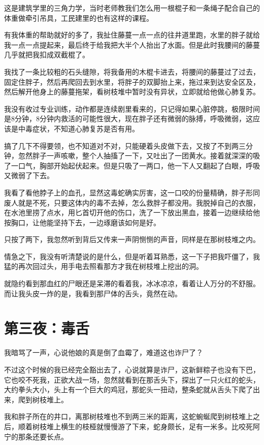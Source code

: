 这是建筑学里的三角力学，当时老师教我们怎么用一根棍子和一条绳子配合自己的体重做牵引吊具，工民建里的也有这样的课程。

有我体重的帮助就好的多了，我扯住藤蔓一点一点的往井道里跑，水里的胖子就给我一点一点提起来，最后终于给我把大半个人抬出了水面。但是此时我腰间的藤蔓几乎就把我扣成双截棍了。

我找了一条比较粗的石头缝隙，将我备用的木棍卡进去，将腰间的藤蔓过了过去，固定住胖子，然后再爬回去到水里，将胖子的双脚抬上来，拖过来到达安全区及，然后解开他身上的藤蔓拖架，看树枝堆中暂时没有异状，立即就给他做心肺复苏。

我没有收过专业训练，动作都是连续剧里看来的，只记得如果心脏停跳，极限时间是8分钟，8分钟内救活的可能性很大，现在胖子还有微弱的脉搏，呼吸微弱，这应该是中毒症状，不知道心肺复苏是否有用。

搞了几下不得要领，也不知道对不对，只能硬着头皮做下去，又按了不到两三分钟，忽然胖子一声咳嗽，整个人抽搐了一下，又吐出了一团黄水。接着就深深的吸了一口气，胸部开始起伏起来。但是只吸了一两口，他一下人又翻起了白眼，呼吸又微弱了下去。

我看了看他脖子上的血孔，显然这毒蛇确实厉害，这一口咬的份量精确，胖子形同废人就是不死，只要这体内的毒不去掉，怎么救胖子都没用。我脱掉自己的衣服，在水池里捞了点水，用匕首切开他的伤口，洗了一下放出黑血，接着一边继续给他按胸口，让他能坚持下去，一边琢磨该如何是好。

只按了两下，我忽然听到背后又传来一声阴恻恻的声音，同样是在那树枝堆之内。

情急之下，我没有听清楚说的是什么，但是听着耳熟悉，这一下子把我吓僵了，我猛的再次回过头，用手电去照看那方才我在树枝堆上挖出的洞。

就隐约看到那血红的尸眼还是呆滞的看着我，冰冰凉凉，看着让人万分的不舒服。而让我头皮一炸的是，我看到那尸体的舌头，竟然在动。

\chapter{第三夜：毒舌}

我暗骂了一声，心说他娘的真是倒了血霉了，难道这也诈尸了？

不过这个时候的我已经完全豁出去了，心说就算是诈尸，这新鲜粽子也没有下巴，它也咬不死我，正欲大战一场，忽然就看到在那舌头下，探出了一只火红的蛇头，大约拳头大小，头上有一个巨大的鸡冠，那蛇头一扭动，整条蛇就从舌头下爬了出来，爬到树枝堆上。

我和胖子所在的井口，离那树枝堆也不到两三米的距离，这蛇蜿蜒爬到树枝堆上之后，顺着树枝堆上横生的枝桠就慢慢游了下来，蛇身颇长，足有一米多。比咬死阿宁的那条还要长点。

